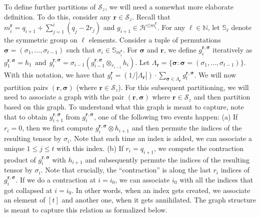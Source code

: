 \documentclass[11pt]{article}
\numberwithin{equation}{section}
\theoremstyle{definition}
\theoremstyle{plain}
\begin{document}
To define further partitions of $\mathcal{S}_z$, we will need a somewhat more elaborate definition. To do this, consider any $\mathbf{r} \in \mathcal{S}_z$. Recall that $m^{\mathbf{r}}_i = q_{i+1} + \sum_{j=1}^{i} (q_j - 2 r_j)$ and $g_{i+1} \in \mathcal{H}^{\odot m^{\mathbf{r}}_i}$. For any $\ell \in \mathbb{N}$, let $\mathbb{S}_\ell$ denote the symmetric group on $\ell$ elements. Consider a tuple of permutations $\boldsymbol{\sigma}= (\sigma_1, \ldots, \sigma_{t-1})$ such that $\sigma_i \in \mathbb{S}_{m^{\mathbf{r}}_i}$. For $\boldsymbol{\sigma}$ and $\mathbf{r}$, we define $g^{\mathbf{r}, \boldsymbol{\sigma}}_i$ iteratively as 
$ 
g^{\mathbf{r}, \boldsymbol{\sigma}}_1 = h_1 \ \  \textrm{and} \ \ g^{\mathbf{r}, \boldsymbol{\sigma}}_i = \sigma_{i-1}(g^{\mathbf{r}, \boldsymbol{\sigma}}_{i-1} {\otimes}_{r_{i-1}} h_i).
$
Let $\Lambda_{\mathbf{r}} = \{\boldsymbol{\sigma} : \boldsymbol{\sigma} = ( \sigma_1, \ldots, \sigma_{t-1})\}$. With this notation, we have that 
$
g^{\mathbf{r}}_t = ({1}/{|\Lambda_{\mathbf{r}}|}) \cdot \sum_{\boldsymbol{\sigma} \in \Lambda_{\mathbf{r}}} g^{\mathbf{r}, \boldsymbol{\sigma}}_t. 
$
We will now partition pairs $(\mathbf{r}, \boldsymbol{\sigma})$ (where $\mathbf{r} \in \mathcal{S}_z$). 
For this subsequent partitioning, we will need to associate a graph with the pair $(\mathbf{r}, \boldsymbol{\sigma})$ where $\mathbf{r} \in \mathcal{S}_z$ and then partition based on this graph. To understand what this graph is meant to capture, note that to obtain $g^{\mathbf{r}, \boldsymbol{\sigma}}_{i+1}$ from $g^{\mathbf{r}, \boldsymbol{\sigma}}_{i}$, one of the following two events happen: (a) If $r_i=0$, then we first compute $g^{\mathbf{r}, \boldsymbol{\sigma}}_{i} \otimes h_{i+1}$ and then permute the indices of the resulting tensor by $\sigma_i$. Note that each time an index is added, we can associate a unique $1 \le j \le t$ with this index. (b) If $r_i =q_{i+1}$, we compute the contraction product of $g^{\mathbf{r}, \boldsymbol{\sigma}}_{i}$ with $h_{i+1}$ and subsequently permute the indices of the resulting tensor by $\sigma_i$. Note that crucially, the ``contraction'' is along the last $r_i$ indices of $g^{\mathbf{r}, \boldsymbol{\sigma}}_{i}$. If we do a contraction at $i=i_0$, we can associate $i_0$ with all the indices that got collapsed at $i=i_0$. In other words, when an index gets created, we associate an element of $[t]$ and another one, when it gets annihilated. The graph structure is meant to capture this relation as formalized below. 
\end{document}

